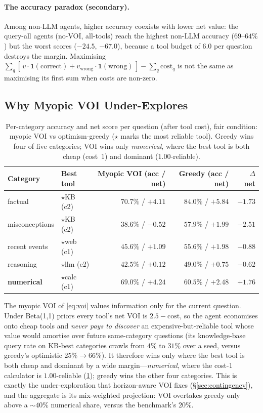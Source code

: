 \documentclass[11pt]{article}
\begin{document}
\paragraph{The accuracy paradox (secondary).} Among non-LLM agents, higher accuracy coexists with lower net value: the query-all agents (no-VOI, all-tools) reach the highest non-LLM accuracy ($69$--$64\%$) but the worst scores ($-24.5$, $-67.0$), because a tool budget of $6.0$ per question destroys the margin. Maximising $\sum_q [\,v\cdot\mathbf{1}(\text{correct}) + v_{\text{wrong}}\cdot\mathbf{1}(\text{wrong})\,] - \sum_q \text{cost}_q$ is not the same as maximising its first sum when costs are non-zero.

\subsection{Why Myopic VOI Under-Explores}
\label{sec:percat}

\begin{table}[t]
\centering
\caption{Per-category accuracy and net score per question (after tool cost), fair condition: myopic VOI vs optimism-greedy ($\star$ marks the most reliable tool). Greedy wins four of five categories; VOI wins only \emph{numerical}, where the best tool is both cheap (cost~$1$) and dominant ($1.00$-reliable).}
\label{tab:percat}
\small
\begin{tabular}{@{}llrrr@{}}
\toprule
Category & Best tool & Myopic VOI (acc / net) & Greedy (acc / net) & $\Delta$ net \\
\midrule
factual & $\star$KB (c2) & $70.7\%$ / $+4.11$ & $84.0\%$ / $+5.84$ & $-1.73$ \\
misconceptions & $\star$KB (c2) & $38.6\%$ / $-0.52$ & $57.9\%$ / $+1.99$ & $-2.51$ \\
recent events & $\star$web (c1) & $45.6\%$ / $+1.09$ & $55.6\%$ / $+1.98$ & $-0.88$ \\
reasoning & $\star$llm (c2) & $42.5\%$ / $+0.12$ & $49.0\%$ / $+0.75$ & $-0.62$ \\
\textbf{numerical} & $\star$calc (c1) & $69.0\%$ / $\mathbf{+4.24}$ & $60.5\%$ / $+2.48$ & $\mathbf{+1.76}$ \\
\bottomrule
\end{tabular}
\end{table}

The myopic VOI of \cref{eq:voi} values information only for the current question. Under Beta(1,1) priors every tool's net VOI is $2.5 - \text{cost}$, so the agent economises onto cheap tools and \emph{never pays to discover} an expensive-but-reliable tool whose value would amortise over future same-category questions (its knowledge-base query rate on KB-best categories crawls from $4\%$ to $31\%$ over a seed, versus greedy's optimistic $25\% \to 66\%$). It therefore wins only where the best tool is both cheap and dominant by a wide margin---\emph{numerical}, where the cost-$1$ calculator is $1.00$-reliable (\cref{tab:percat}); greedy wins the other four categories. This is exactly the under-exploration that horizon-aware VOI fixes (\S\ref{sec:contingency}), and the aggregate is its mix-weighted projection: VOI overtakes greedy only above a ${\sim}40\%$ numerical share, versus the benchmark's $20\%$.
\end{document}
